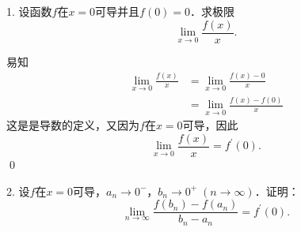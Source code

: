 \exercise

1. 设函数$f$在$x=0$可导并且$f(0) = 0$．求极限
\begin{equation*}
    \lim_{x \to 0} \frac{f(x)}{x}.
\end{equation*}

\solve 易知
\begin{align}
    \lim_{x \to 0}\frac{f(x)}{x} &= \lim_{x \to 0} \frac{f(x)-0}{x} \\
    &= \lim_{x \to 0} \frac{f(x)-f(0)}{x} 
\end{align}
这是是导数的定义，又因为$f$在$x=0$可导，因此
\begin{equation}
    \lim_{x \to 0} \frac{f(x)}{x} = f^\prime (0).
\end{equation}
\qed\bigskip

2. 设$f$在$x = 0$可导，$a_n \to 0^-$，$b_n \to 0^+  \; (n \to \infty)$．证明：
\begin{equation*}
    \lim_{n \to \infty} \frac{f(b_n) - f(a_n)}{b_n - a_n} = f^\prime (0).
\end{equation*}

